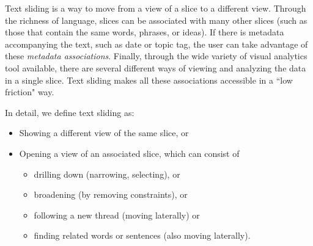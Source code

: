 \documentclass{sig-alternate}
\begin{document}
\begin{enumerate}
Text sliding is a way to move from a view of a slice to a different view. Through the richness of language, slices can be associated with many other slices (such as those that contain the same  words, phrases, or ideas). If there is metadata accompanying the text, such as date or topic tag, the user can take advantage of these  \emph{metadata associations}.  Finally, through the wide variety of visual analytics tool available, there are several different ways of viewing and analyzing the data in a single slice. Text sliding makes all these associations accessible in a ``low friction" way.

In detail, we define text sliding as:
\begin{itemize}
	\item Showing a different view of the same slice, or
	\item Opening a  view of an associated slice, which can consist of
	\begin{itemize}
	  \item drilling down (narrowing, selecting), or
	  \item broadening (by removing constraints), or
	  \item following a new thread (moving laterally) or
	  \item finding related words or sentences  (also moving laterally).
	 \end{itemize}
\end{itemize}


\end{enumerate}
\end{document}
